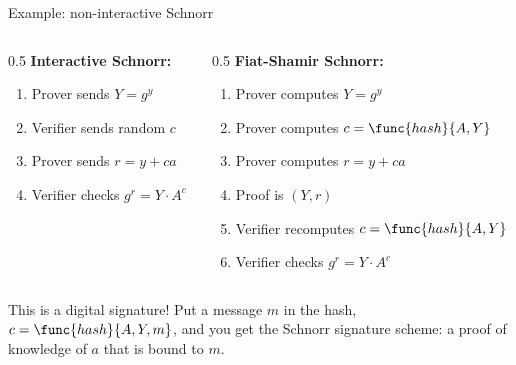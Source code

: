 \ifdefined\PRESENTATION\else\PassOptionsToClass{handout}{beamer}\fi\documentclass[aspectratio=169, lualatex]{beamer}
\begin{document}
\begin{frame}{Example: non-interactive Schnorr}
	\begin{columns}[c]
		\begin{column}{0.5\textwidth}
			\textbf{Interactive Schnorr:}
			\begin{enumerate}
				\item Prover sends $Y = g^y$
				\item Verifier sends random $c$
				\item Prover sends $r = y + ca$
				\item Verifier checks $g^r = Y \cdot A^c$
			\end{enumerate}
		\end{column}
		\begin{column}{0.5\textwidth}
			\textbf{Fiat-Shamir Schnorr:}
			\begin{enumerate}
				\item Prover computes $Y = g^y$
				\item Prover computes $c = \func{hash}{A, Y}$
				\item Prover computes $r = y + ca$
				\item Proof is $(Y, r)$
				\item Verifier recomputes $c = \func{hash}{A, Y}$
				\item Verifier checks $g^r = Y \cdot A^c$
			\end{enumerate}
		\end{column}
	\end{columns}
	\begin{alertblock}{This is a digital signature!}
		Put a message $m$ in the hash, $c = \func{hash}{A, Y, m}$, and you get the Schnorr signature scheme: a proof of knowledge of $a$ that is bound to $m$.
	\end{alertblock}
\end{frame}
\end{document}
